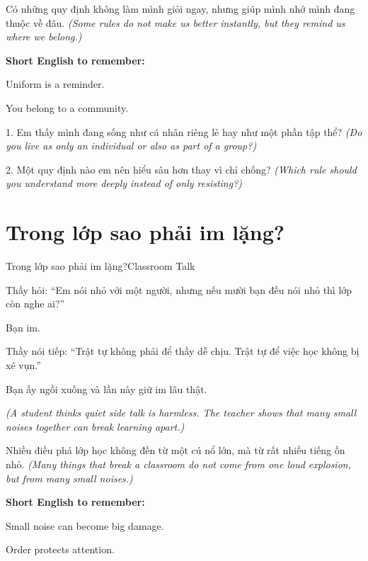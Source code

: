 \begin{baihoc}
Có những quy định không làm mình giỏi ngay, nhưng giúp mình nhớ mình đang thuộc về đâu.
\textit{(Some rules do not make us better instantly, but they remind us where we belong.)}
\end{baihoc}

\begin{ghinhoanh}
\textbf{Short English to remember:}

Uniform is a reminder.

You belong to a community.
\end{ghinhoanh}

\begin{tuhocnhanh}
1. Em thấy mình đang sống như cá nhân riêng lẻ hay như một phần tập thể? \textit{(Do you live as only an individual or also as part of a group?)}

2. Một quy định nào em nên hiểu sâu hơn thay vì chỉ chống? \textit{(Which rule should you understand more deeply instead of only resisting?)}
\end{tuhocnhanh}
\ngancach

\section{Trong lớp sao phải im lặng?}
\begin{truyen}{Trong lớp sao phải im lặng?}{Classroom Talk}

Thầy hỏi: ``Em nói nhỏ với một người, nhưng nếu mười bạn đều nói nhỏ thì lớp còn nghe ai?''

Bạn im.

Thầy nói tiếp: ``Trật tự không phải để thầy dễ chịu. Trật tự để việc học không bị xé vụn.''

Bạn ấy ngồi xuống và lần này giữ im lâu thật.

\textit{(A student thinks quiet side talk is harmless. The teacher shows that many small noises together can break learning apart.)}
\end{truyen}

\begin{baihoc}
Nhiều điều phá lớp học không đến từ một cú nổ lớn, mà từ rất nhiều tiếng ồn nhỏ.
\textit{(Many things that break a classroom do not come from one loud explosion, but from many small noises.)}
\end{baihoc}

\begin{ghinhoanh}
\textbf{Short English to remember:}

Small noise can become big damage.

Order protects attention.
\end{ghinhoanh}

